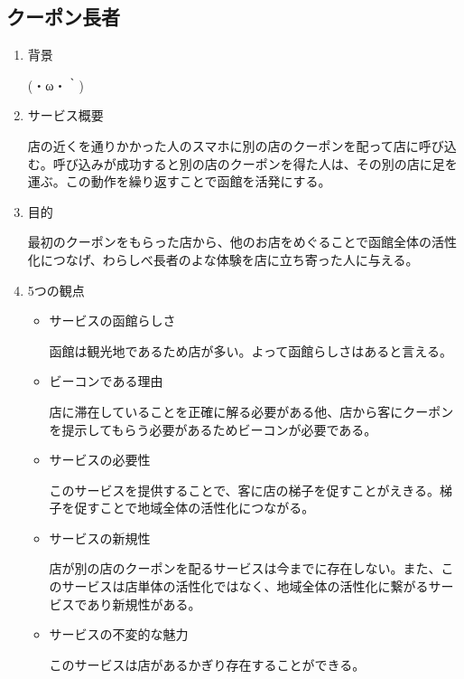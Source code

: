 \subsection{クーポン長者}
\begin{enumerate}
    \item 背景
    \par (・ω・｀)
    \item サービス概要
    \par 店の近くを通りかかった人のスマホに別の店のクーポンを配って店に呼び込む。呼び込みが成功すると別の店のクーポンを得た人は、その別の店に足を運ぶ。この動作を繰り返すことで函館を活発にする。
    \item 目的
    \par 最初のクーポンをもらった店から、他のお店をめぐることで函館全体の活性化につなげ、わらしべ長者のよな体験を店に立ち寄った人に与える。
    \item 5つの観点
    \begin{itemize}
        \item サービスの函館らしさ
        \par 函館は観光地であるため店が多い。よって函館らしさはあると言える。
        \item ビーコンである理由
        \par 店に滞在していることを正確に解る必要がある他、店から客にクーポンを提示してもらう必要があるためビーコンが必要である。
        \item サービスの必要性
        \par このサービスを提供することで、客に店の梯子を促すことがえきる。梯子を促すことで地域全体の活性化につながる。
        \item サービスの新規性
        \par 店が別の店のクーポンを配るサービスは今までに存在しない。また、このサービスは店単体の活性化ではなく、地域全体の活性化に繋がるサービスであり新規性がある。
        \item サービスの不変的な魅力
        \par このサービスは店があるかぎり存在することができる。
    \end{itemize}
\end{enumerate}

